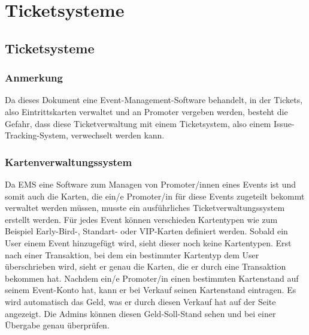 \chapter{Ticketsysteme}
\reiter
\section{Ticketsysteme}
\subsection{Anmerkung}
Da dieses Dokument eine Event-Management-Software behandelt, in der Tickets, also Eintrittskarten verwaltet und an Promoter vergeben werden, besteht die Gefahr, dass diese Ticketverwaltung mit einem Ticketsystem, also einem Issue-Tracking-System, verwechselt werden kann.  
\subsection{Kartenverwaltungssystem}
Da EMS eine Software zum Managen von Promoter/innen eines Events ist und somit auch die Karten, die ein/e Promoter/in für diese Events zugeteilt bekommt verwaltet werden müssen, musste ein ausführliches Ticketverwaltungssystem erstellt werden.
Für jedes Event können verschieden Kartentypen wie zum Beispiel Early-Bird-, Standart- oder VIP-Karten definiert werden. Sobald ein User einem Event hinzugefügt wird, sieht dieser noch keine Kartentypen. Erst nach einer Transaktion, bei dem ein bestimmter Kartentyp dem User überschrieben wird, sieht er genau die Karten, die er durch eine Transaktion bekommen hat. 
Nachdem ein/e Promoter/in einen bestimmten Kartenstand auf seinem Event-Konto hat, kann er bei Verkauf seinen Kartenstand eintragen. Es wird automatisch das Geld, was er durch diesen Verkauf hat auf der Seite angezeigt. Die Admins können diesen Geld-Soll-Stand sehen und bei einer Übergabe genau überprüfen. 
